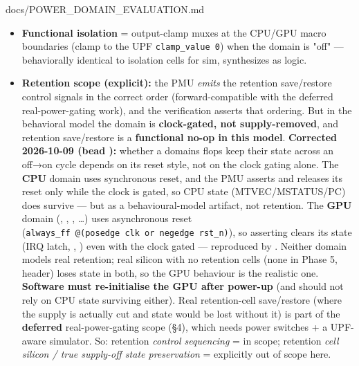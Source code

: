 \begin{relocated}{docs/POWER_DOMAIN_EVALUATION.md}
\begin{itemize}
  \begin{itemize}
  \tightlist
  \item
    \textbf{Power-down} (e.g. enter CPU\_OFF): assert retention-save →
    assert isolation (clamp outputs) → gate clock → (optionally) assert
    domain reset. Mirrors the  rule "save BEFORE
    the switch opens".
  \item
    \textbf{Power-up} (exit to NORMAL): (release domain reset) → ungate
    clock → assert retention-restore → de-assert isolation. Mirrors
    "restore AFTER the switch closes".
  \item
    This is the actual \emph{sequencing} logic --- the part with real
    design content.
  \end{itemize}
\item
  \textbf{Functional isolation} = output-clamp muxes at the CPU/GPU
  macro boundaries (clamp to the UPF
  \texttt{clamp\_\allowbreak{}value\ 0}) when the domain is "off" ---
  behaviorally identical to isolation cells for sim, synthesizes as
  logic.
\item
  \textbf{Retention scope (explicit):} the PMU \emph{emits} the
  retention save/\allowbreak{}restore control signals in the correct
  order (forward-compatible with the deferred real-power-gating work),
  and the verification asserts that ordering. But in the behavioral
  model the domain is \textbf{clock-gated, not supply-removed}, and
  retention save/\allowbreak{}restore is a \textbf{functional no-op in
  this model}. \warn{} \textbf{Corrected 2026-10-09 (bead ):}
  whether a domain\textquotesingle s flops keep their state across an
  off→on cycle depends on its reset style, not on the clock gating
  alone. The \textbf{CPU} domain uses synchronous reset, and the PMU
  asserts and releases its reset only while the clock is gated, so CPU
  state (MTVEC/\allowbreak{}MSTATUS/\allowbreak{}PC) does survive ---
  but as a behavioural-model artifact, not retention. The \textbf{GPU}
  domain (, ,
  , \ldots) uses asynchronous reset
  (\texttt{always\_\allowbreak{}ff\ @(posedge\ clk\ or\ negedge\ rst\_\allowbreak{}n)}),
  so asserting  clears its state (IRQ latch,
  , ) even with the clock
  gated --- reproduced by
  .
  Neither domain models real retention; real silicon with no retention
  cells (none in Phase 5,  header) loses state in
  both, so the GPU behaviour is the realistic one. \textbf{Software must
  re-initialise the GPU after power-up} (and should not rely on CPU
  state surviving either). Real retention-cell save/\allowbreak{}restore
  (where the supply is actually cut and state would be lost without it)
  is part of the \textbf{deferred} real-power-gating scope (§4), which
  needs power switches + a UPF-aware simulator. So: retention
  \emph{control sequencing} = in scope; retention \emph{cell silicon /
  true supply-off state preservation} = explicitly out of scope here.
\end{itemize}


\end{relocated}
